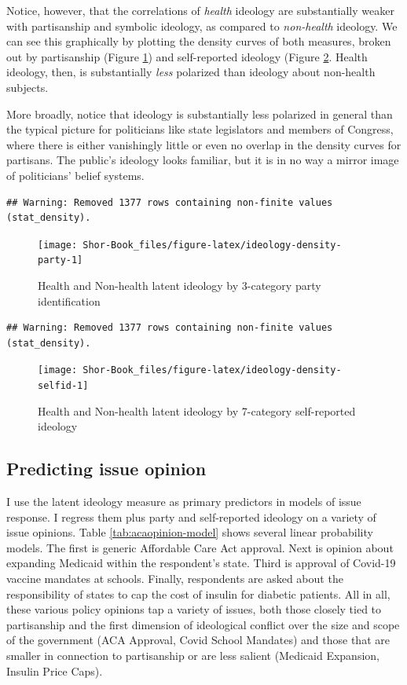 \documentclass[
  oneside]{book}
\begin{document}
Notice, however, that the correlations of \emph{health} ideology are substantially weaker with partisanship and symbolic ideology, as compared to \emph{non-health} ideology. We can see this graphically by plotting the density curves of both measures, broken out by partisanship (Figure \ref{fig:ideology-density-party}) and self-reported ideology (Figure \ref{fig:ideology-density-selfid}. Health ideology, then, is substantially \emph{less} polarized than ideology about non-health subjects.

More broadly, notice that ideology is substantially less polarized in general than the typical picture for politicians like state legislators and members of Congress, where there is either vanishingly little or even no overlap in the density curves for partisans. The public's ideology looks familiar, but it is in no way a mirror image of politicians' belief systems.

\begin{verbatim}
## Warning: Removed 1377 rows containing non-finite values (stat_density).
\end{verbatim}

\begin{figure}
\texttt{[image: Shor-Book\_files/figure-latex/ideology-density-party-1]} \caption{Health and Non-health latent ideology by 3-category party identification}\label{fig:ideology-density-party}
\end{figure}

\begin{verbatim}
## Warning: Removed 1377 rows containing non-finite values (stat_density).
\end{verbatim}

\begin{figure}
\texttt{[image: Shor-Book\_files/figure-latex/ideology-density-selfid-1]} \caption{Health and Non-health latent ideology by 7-category self-reported ideology}\label{fig:ideology-density-selfid}
\end{figure}

\hypertarget{predicting-issue-opinion}{%
\subsection{Predicting issue opinion}\label{predicting-issue-opinion}}

I use the latent ideology measure as primary predictors in models of issue response. I regress them plus party and self-reported ideology on a variety of issue opinions. Table \ref{tab:acaopinion-model} shows several linear probability models. The first is generic Affordable Care Act approval. Next is opinion about expanding Medicaid within the respondent's state. Third is approval of Covid-19 vaccine mandates at schools. Finally, respondents are asked about the responsibility of states to cap the cost of insulin for diabetic patients. All in all, these various policy opinions tap a variety of issues, both those closely tied to partisanship and the first dimension of ideological conflict over the size and scope of the government (ACA Approval, Covid School Mandates) and those that are smaller in connection to partisanship or are less salient (Medicaid Expansion, Insulin Price Caps).
\end{document}

